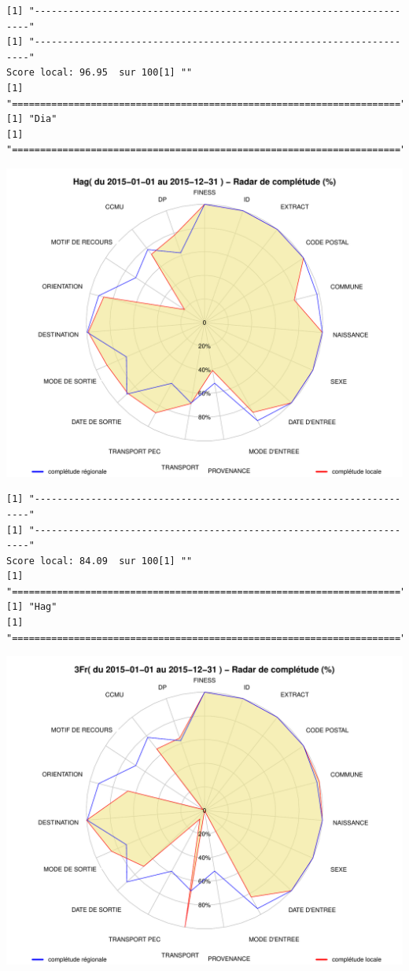 \documentclass[]{article}
\begin{document}
\begin{verbatim}
[1] "---------------------------------------------------------------------"
[1] "---------------------------------------------------------------------"
Score local: 96.95  sur 100[1] ""
[1] "====================================================================="
[1] "Dia"
[1] "====================================================================="
\end{verbatim}

\includegraphics{completude_files/figure-latex/finess-6.pdf}

\begin{verbatim}
[1] "---------------------------------------------------------------------"
[1] "---------------------------------------------------------------------"
Score local: 84.09  sur 100[1] ""
[1] "====================================================================="
[1] "Hag"
[1] "====================================================================="
\end{verbatim}

\includegraphics{completude_files/figure-latex/finess-7.pdf}
\end{document}
